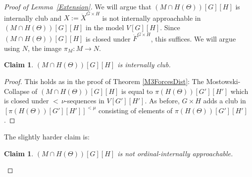 \documentclass[a4paper]{amsart}
\theoremstyle{definition}
\theoremstyle{remark}
\theoremstyle{plain}
\newtheorem{myclan}[mydef]{Claim}
\numberwithin{mydef}{section}
\newcommand{\dM}{\mathbb{M}}
\newcommand{\dQ}{\mathbb{Q}}
\begin{document}
\begin{proof}[Proof of Lemma~\ref{Extension}]
		
		We will argue that $(M \cap H(\Theta))[G][H]$ is internally club and $X:=\dot{X}^{G \times H}$ is not internally approachable in $(M\cap H(\Theta))[G][H]$ in the model $V[G][H]$. Since $(M \cap H(\Theta))[G][H]$ is closed under $\dot{F}^{G\times H}$, this suffices. We will argue using $N$, the image $\pi_M:M \to N$.
		

		
		
		
		\begin{myclan}
			$(M \cap H(\Theta))[G][H]$ is internally club.
		\end{myclan}
		\begin{proof}
			This holds as in the proof of Theorem \ref{M3ForcesDist}: The Mostowski-Collapse of $(M\cap H(\Theta))[G][H]$ is equal to $\pi(H(\Theta))[G'][H']$ which is closed under ${<}\,\nu$-sequences in $V[G'][H']$. As before, $G\times H$ adds a club in $[\pi(H(\Theta))[G'][H']]^{<\mu}$ consisting of elements of $\pi(H(\Theta))[G'][H']$.
		\end{proof}
			
	
		
		The slightly harder claim is:
		
		\begin{myclan}
			$(M\cap H(\Theta))[G][H]$ is not ordinal-internally approachable.
		\end{myclan}
		

\end{proof}
\end{document}
